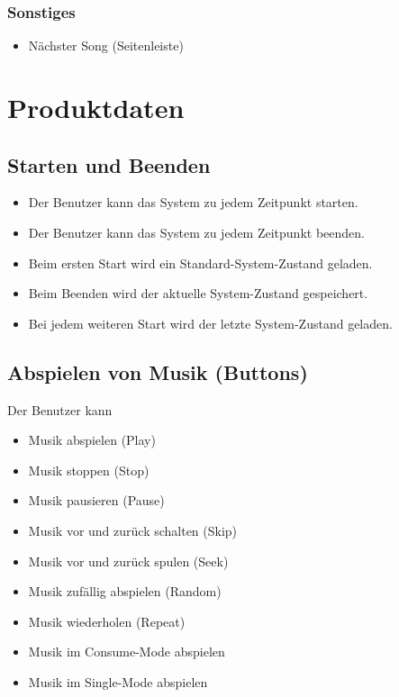 \subsubsection{Sonstiges}
\begin{itemize}
	\item Nächster Song (Seitenleiste)
\end{itemize}

\section{Produktdaten}

\subsection{Starten und Beenden}
\begin{itemize}
	\item Der Benutzer kann das System zu jedem Zeitpunkt starten.
	\item Der Benutzer kann das System zu jedem Zeitpunkt beenden.
	\item Beim ersten Start wird ein Standard-System-Zustand geladen.
	\item Beim Beenden wird der aktuelle System-Zustand gespeichert.
	\item Bei jedem weiteren Start wird der letzte System-Zustand geladen.
\end{itemize}
\subsection{Abspielen von Musik (Buttons)}
Der Benutzer kann
\begin{itemize}
	\item Musik abspielen (Play)
	\item Musik stoppen (Stop)
	\item Musik pausieren (Pause)
	\item Musik vor und zurück schalten (Skip)
	\item Musik vor und zurück spulen (Seek)
	\item Musik zufällig abspielen (Random)
	\item Musik wiederholen (Repeat)
	\item Musik im Consume-Mode abspielen
	\item Musik im Single-Mode abspielen
\end{itemize}
